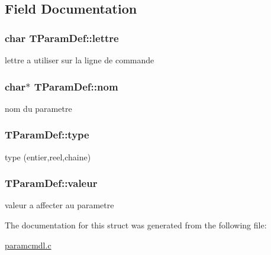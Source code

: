 \subsection{Field Documentation}
\subsubsection[{\texorpdfstring{lettre}{lettre}}]{\setlength{\rightskip}{0pt plus 5cm}char T\+Param\+Def\+::lettre}\hypertarget{structTParamDef_a66254f6368c5542d3f14afdd1ea1e621}{}\label{structTParamDef_a66254f6368c5542d3f14afdd1ea1e621}
lettre a utiliser sur la ligne de commande 
\subsubsection[{\texorpdfstring{nom}{nom}}]{\setlength{\rightskip}{0pt plus 5cm}char$\ast$ T\+Param\+Def\+::nom}\hypertarget{structTParamDef_afa78db012abc7fecd18c60d6154e04f8}{}\label{structTParamDef_afa78db012abc7fecd18c60d6154e04f8}
nom du parametre 
\subsubsection[{\texorpdfstring{type}{type}}]{ T\+Param\+Def\+::type}\hypertarget{structTParamDef_aaa8c69f39c6dd02a968dc15044810327}{}\label{structTParamDef_aaa8c69f39c6dd02a968dc15044810327}
type (entier,reel,chaine) 
\subsubsection[{\texorpdfstring{valeur}{valeur}}]{ T\+Param\+Def\+::valeur}\hypertarget{structTParamDef_a3f5cbf75e393d35bb230dfe293f7c7ba}{}\label{structTParamDef_a3f5cbf75e393d35bb230dfe293f7c7ba}
valeur a affecter au parametre 

The documentation for this struct was generated from the following file\+:\begin{DoxyCompactItemize}
\item 
\hyperlink{paramcmdl_8c}{paramcmdl.\+c}\end{DoxyCompactItemize}
